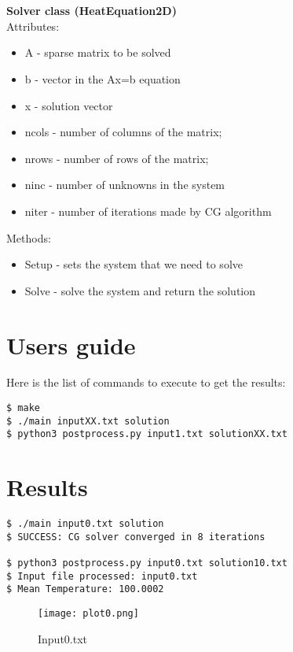 \documentclass[12pt,a4paper]{article}
\begin{document}
\\
\\ 

\textbf{Solver class (HeatEquation2D)} \\
Attributes:
\begin{itemize}
    \item A - sparse matrix to be solved
    \item b - vector in the Ax=b equation
    \item x - solution vector
    \item ncols - number of columns of the matrix;
    \item nrows - number of rows of the matrix;
    \item ninc - number of unknowns in the system
    \item niter - number of iterations made by CG algorithm
\end{itemize}

Methods:
\begin{itemize}
    \item Setup - sets the system that we need to solve
    \item Solve - solve the system and return the solution
\end{itemize}




\section{Users guide}

Here is the list of commands to execute to get the results:

\begin{verbatim}
$ make
$ ./main inputXX.txt solution
$ python3 postprocess.py input1.txt solutionXX.txt
\end{verbatim}


\section{Results}



\begin{verbatim}
$ ./main input0.txt solution
$ SUCCESS: CG solver converged in 8 iterations

$ python3 postprocess.py input0.txt solution10.txt
$ Input file processed: input0.txt
$ Mean Temperature: 100.0002
\end{verbatim}


\begin{figure}[h!]
  \centerline{\texttt{[image: plot0.png]}}
  \caption{Input0.txt}
  
\end{figure}
\end{document}
